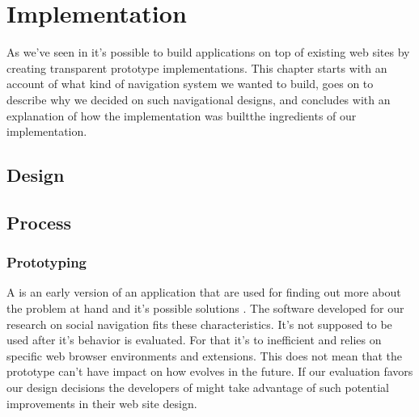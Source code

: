 \chapter{Implementation}
\label{chapter:implementation}


As we've seen in 
it's possible to build applications on top of existing web sites by creating
transparent prototype implementations. This chapter starts with an account of
what kind of navigation system we wanted to build, goes on to describe why we
decided on such navigational designs, and concludes with an explanation of how
the implementation was built\dash{}the ingredients of our implementation.

\section{Design}

%
%

\section{Process}

\subsection{Prototyping}

A  is an early version of an application that are used for
finding out more about the problem at hand and it's possible solutions
\citep[p.~409]{sommerville07}.
The software developed for our research on social navigation fits these
characteristics. It's not supposed to be used after it's behavior is
evaluated. For that it's to inefficient and relies on specific web browser
environments and extensions. This does not mean that the prototype can't have
impact on how \urort{} evolves in the future. If our evaluation favors our
design decisions the developers of \urort{} might take advantage of such
potential improvements in their web site design.

